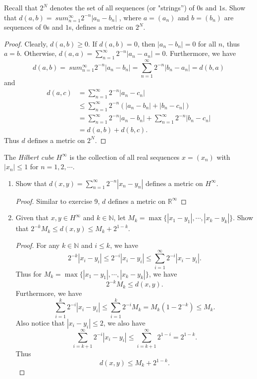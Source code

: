 \documentclass[12pt, a4paper]{article}
\theoremstyle{plain}
\newcommand{\N}{\mathbb{N}}
\newcommand{\R}{\mathbb{R}}
\begin{document}
\begin{exercise}{9}
Recall that $2^N$ denotes the set of all sequences (or "strings'') of $0$s and $1$s. Show
that $d(a,b)=\
sum_{n=1}^{\infty}{2^{-n}|a_n-b_n|}$ , where $a = (a_n)$ and $b = (b_n)$ are sequences of
$0$s and $1$s, defines a metric on $2^N$.
\end{exercise}
	\begin{proof}
	Clearly, $d(a,b)\geq 0$. If $d(a,b)=0$, then $|a_n-b_n|=0$ for all $n$, thus $a=b$. Otherwise, $d(a,a)=\sum_{n=1}^{\infty}{2^{-n}|a_n-a_n|}=0$. Furthermore, we have
\[
d(a,b)=\
sum_{n=1}^{\infty}{2^{-n}|a_n-b_n|}=\sum_{n=1}^{\infty}{2^{-n}|b_n-a_n|}=d(b,a)
\]
and
\begin{align*}
d(a,c)&=\sum_{n=1}^{\infty}{2^{-n}|a_n-c_n|}\\
&\leq \sum_{n=1}^{\infty}{2^{-n}(|a_n-b_n|+|b_n-c_n|)}\\
&=\sum_{n=1}^{\infty}{2^{-n}|a_n-b_n|}+\sum_{n=1}^{\infty}{2^{-n}|b_n-c_n|}\\
&=d(a,b)+d(b,c).
\end{align*}
Thus $d$ defines a metric on $2^N$.
	\end{proof}

\begin{exercise}{10}
The \textit{Hilbert cube} $H^\infty$ is the collection of all real sequences $x=(x_n)$ with $|x_n|\leq 1$ for $n=1,2,\cdots$.
	\begin{enumerate}[label=(\roman*)]
	\item Show that $d(x,y)=\sum_{n=1}^\infty{2^{-n}|x_n-y_n|}$ defines a metric on $H^\infty$.
	\begin{proof}
	Similar to exercise 9, $d$ defines a metric on $\R^\infty$
	\end{proof}
	\item Given that $x,y\in H^\infty$ and $k\in\N$, let $M_k=\max\{|x_1-y_1|,\cdots ,|x_k-y_k|\}$. Show that $2^{-k}M_k\leq d(x,y)\leq M_k+2^{1-k}$.
	\begin{proof}
	For any $k\in\N$ and $i\leq k$, we have
	\[
	2^{-k}|x_i-y_i|\leq 2^{-i}|x_i-y_i|\leq \sum_{i=1}^{\infty}{2^{-i}|x_i-y_i|}.
	\]
	Thus for $M_k=\max\{|x_1-y_1|,\cdots ,|x_k-y_k|\}$, we have 
	\[
	2^{-k}M_k\leq d(x,y).
	\]
	Furthermore, we have 
	\[
	\sum_{i=1}^{k}{2^{-i}|x_i-y_i|}\leq \sum_{i=1}^{k}{2^{-i}M_k}= M_k(1-2^{-k})\leq M_k.
	\]
	Also notice that $|x_i-y_i|\leq 2$, we also have
	\[
	\sum_{i=k+1}^{\infty}{2^{-i}|x_i-y_i|}\leq \sum_{i=k+1}^{\infty}{2^{1-i}}=2^{1-k}.
	\]
	Thus 
	\[
	d(x,y)\leq M_k+2^{1-k}.
	\]
	\end{proof}
	\end{enumerate}
\end{exercise}
\end{document}
